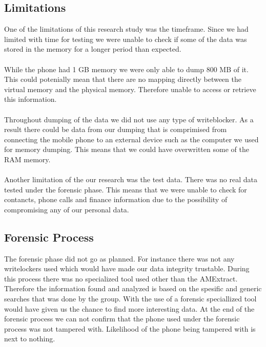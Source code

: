 \subsection{Limitations}
One of the limitations of this research study was the timeframe. Since we had limited with time for testing we were unable to check if some of the data was stored in the memory for a longer period than expected. 
\\\\
While the phone had 1 GB memory we were only able to dump 800 MB of it. This could potenially mean that there are no mapping directly between the virtual memory and the physical memory. Therefore unable to access or retrieve this information. 
\\\\
Throughout dumping of the data we did not use any type of writeblocker. As a result there could be data from our dumping that is comprimised from connecting the mobile phone to an external device such as the computer we used for memory dumping. This means that we could have overwritten some of the RAM memory.
\\\\
Another limitation of the our research was the test data. There was no real data tested under the forensic phase. This means that we were unable to check for contancts, phone calls and finance information due to the possibility of compromising any of our personal data.
\subsection{Forensic Process}
The forensic phase did not go as planned. For instance there was not any writelockers used which would have made our data integrity trustable. During this process there was no specialized tool used other than the AMExtract. Therefore the information found and analyzed is based on the spesific and generic searches that was done by the group. With the use of a forensic speciallized tool would have given us the chance to find more interesting data. At the end of the forensic process we can not confirm that the phone used under the forensic process was not tampered with. Likelihood of the phone being tampered with is next to nothing.